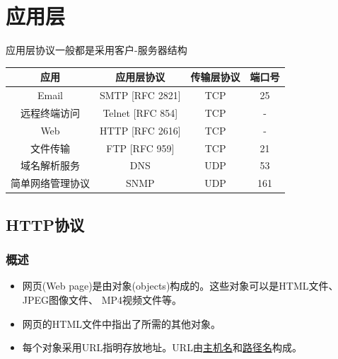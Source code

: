 
\section{应用层}
应用层协议一般都是采用客户-服务器结构
\begin{center}
\begin{tabular}{|c|c|c|c|}\hline
应用 & 应用层协议 & 传输层协议 & 端口号\\\hline
Email & SMTP [RFC 2821] & TCP & 25\\\hline
远程终端访问 & Telnet [RFC 854] & TCP & -\\\hline
Web & HTTP [RFC 2616] & TCP & -\\\hline
文件传输 & FTP [RFC 959] & TCP & 21\\\hline
域名解析服务 & DNS & UDP & 53\\\hline
简单网络管理协议 & SNMP & UDP & 161\\\hline
\end{tabular}
\end{center}

\subsection{HTTP协议}
\subsubsection{概述}
\begin{itemize}
\item 网页(Web page)是由对象(objects)构成的。这些对象可以是HTML文件、 JPEG图像文件、 MP4视频文件等。
\item 网页的HTML文件中指出了所需的其他对象。
\item 每个对象采用URL指明存放地址。URL由\underline{主机名}和\underline{路径名}构成。
\end{itemize}

